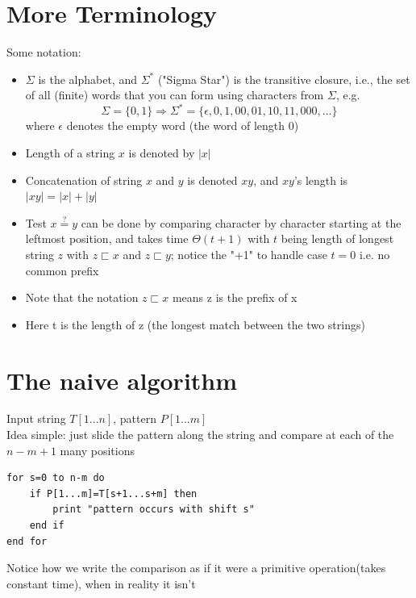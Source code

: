 \documentclass{article}[18pt]
\begin{document}
\section{More Terminology}
Some notation:
\begin{itemize}
	\item $\Sigma$ is the alphabet, and $\Sigma^*$ ("Sigma Star") is the transitive closure, i.e., the set of all (finite) words that you can form using characters from $\Sigma$, e.g.
	\[ 
	\Sigma=\{0,1\} \Rightarrow \Sigma^{*}=\{\epsilon, 0,1,00,01,10,11,000, \ldots\}
	\]
	where $\epsilon$ denotes the empty word (the word of length 0)
	\item Length of a string $x$ is denoted by $|x|$
	\item Concatenation of string $x$ and $y$ is denoted $xy$, and $xy$'s length is $|xy|=|x|+|y|$
	\item Test $x\stackrel{?}{=}y$ can be done by comparing character by character starting at the leftmost position, and takes time $\Theta(t+1)$ with $t$ being length of longest string $z$ with $z  \sqsubset x$ and $z\sqsubset y$; notice the "+1" to handle case $t=0$ i.e. no common prefix
	\item Note that the notation $z\sqsubset x$ means z is the prefix of x
	\item Here t is the length of z (the longest match between the two strings)
\end{itemize}
\section{The naive algorithm}
Input string $T[1...n]$, pattern $P[1...m]$\\
Idea simple: just slide the pattern along the string and compare at each of the $n-m+1$ many positions
\begin{lstlisting}[caption=Naive Matcher]
for s=0 to n-m do
	if P[1...m]=T[s+1...s+m] then
		print "pattern occurs with shift s"
	end if
end for
\end{lstlisting}
Notice how we write the comparison as if it were a primitive operation(takes constant time), when in reality it isn't
\end{document}
